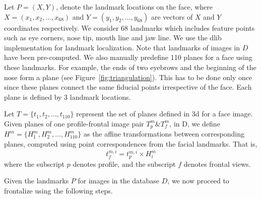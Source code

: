 Let $P = (X, Y)$, denote the landmark locations on the face, where $X=(x_1, x_2, \ldots , x_{68})$ and
$Y=(y_1, y_2, \ldots , y_{68})$ are vectors of $X$ and $Y$ coordinates respectively. We consider 68 landmarks 
which includes feature points such as eye corners, nose tip, mouth line and jaw line. 
We use the dlib~\cite{kazemi2014one} implementation for landmark localization.  Note that landmarks of images in $D$ have been pre-computed.
We also manually predefine 110 planes for a face using these landmarks. For example, the ends of two
eyebrows and the beginning of the nose form a plane (see Figure~\ref{fig:triangulation}). This has to be done
only once since these planes connect the same fiducial points irrespective of the face. Each plane is
defined by 3 landmark locations. 

Let $T = \{t_{1}, t_{2}, \ldots , t_{110}\}$
represent the set of planes defined in {\sc 3d} for a face image. Given planes of one
profile-frontal image pair $T_p^m \& T_f^m$, in D, we define $H^{m} = \{H_1^m, H_2^m, \ldots ,
H_{110}^m\}$ as the affine transformations between corresponding planes, computed using point correspondences from the facial landmarks. That is, 
\begin{equation}
  t_{f}^{m,i} = t_{p}^{m,i} \times H_i^m \label{eq:affine_transfomraiton}
\end{equation} 
where the subscript $p$ denotes profile, and the subscript $f$ denotes frontal views.

Given the landmarks $P$ for images in the database $D$, we now
proceed to frontalize using the following steps.
